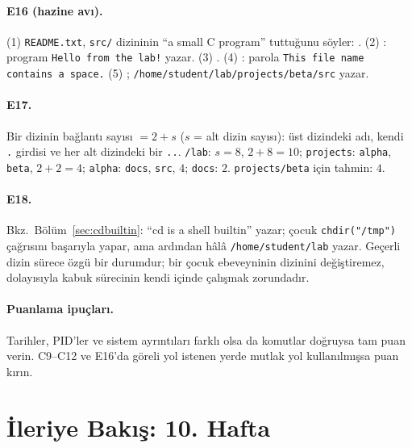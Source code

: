 \paragraph{E16 (hazine avı).} (1) \texttt{README.txt}, \texttt{src/} dizininin ``a small C program'' tuttuğunu söyler: . (2) : program \texttt{Hello from the lab!} yazar. (3) . (4) : parola \texttt{This file name contains a space.} (5) ;  \texttt{/home/student/lab/projects/beta/src} yazar.

\paragraph{E17.} Bir dizinin bağlantı sayısı $= 2 + s$ ($s$ = alt dizin sayısı): üst dizindeki adı, kendi \texttt{.} girdisi ve her alt dizindeki bir \texttt{..}. \texttt{\tl/lab}: $s = 8$, $2+8 = 10$; \texttt{projects}: \texttt{alpha}, \texttt{beta}, $2+2 = 4$; \texttt{alpha}: \texttt{docs}, \texttt{src}, $4$; \texttt{docs}: $2$. \texttt{projects/beta} için tahmin: $4$.

\paragraph{E18.} Bkz.\ Bölüm~\ref{sec:cdbuiltin}:  ``cd is a shell builtin'' yazar; çocuk  \texttt{chdir("/tmp")} çağrısını başarıyla yapar, ama ardından  hâlâ \texttt{/home/student/lab} yazar. Geçerli dizin sürece özgü bir durumdur; bir çocuk ebeveyninin dizinini değiştiremez, dolayısıyla  kabuk sürecinin kendi içinde çalışmak zorundadır.

\paragraph{Puanlama ipuçları.} Tarihler, PID'ler ve sistem ayrıntıları farklı olsa da komutlar doğruysa tam puan verin. C9--C12 ve E16'da göreli yol istenen yerde mutlak yol kullanılmışsa puan kırın.

\section{İleriye Bakış: 10. Hafta}

